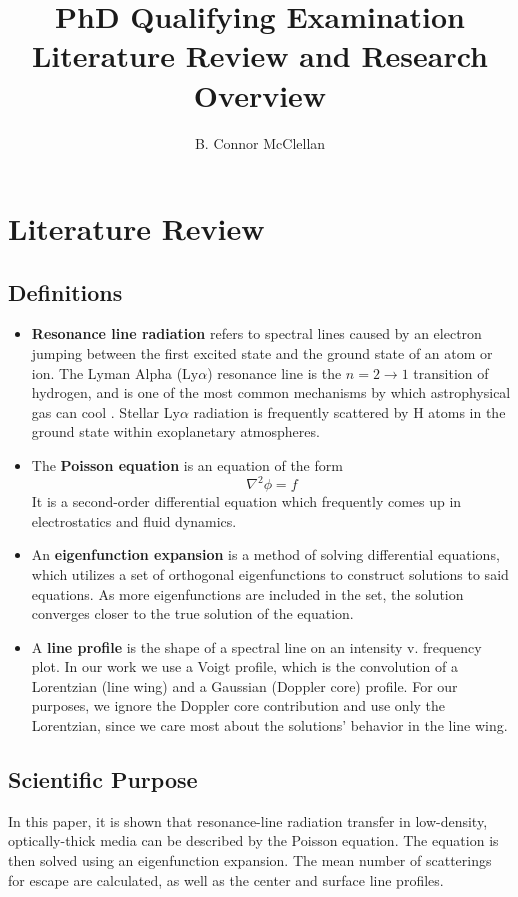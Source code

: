 \documentclass[onecolumn]{aastex63}
\begin{document}
\title{PhD Qualifying Examination \\ \small{\normalfont Literature Review and Research Overview}}
\author{B. Connor McClellan}
\keywords{}

\tableofcontents

\section{Literature Review}

\subsection{Definitions}
\begin{itemize}
    \item \textbf{Resonance line radiation} refers to spectral lines caused by an electron jumping between the first excited state and the ground state of an atom or ion. The Lyman Alpha (Ly$\alpha$) resonance line is the $n=2\rightarrow1$ transition of hydrogen, and is one of the most common mechanisms by which astrophysical gas can cool \citep{neufeld1990}. Stellar Ly$\alpha$ radiation is frequently scattered by H atoms in the ground state within exoplanetary atmospheres.
    \item The \textbf{Poisson equation} is an equation of the form
    \begin{equation}
        \nabla^2 \phi = f
    \end{equation}
    It is a second-order differential equation which frequently comes up in electrostatics and fluid dynamics.
    \item An \textbf{eigenfunction expansion} is a method of solving differential equations, which utilizes a set of orthogonal eigenfunctions to construct solutions to said equations. As more eigenfunctions are included in the set, the solution converges closer to the true solution of the equation.
    \item A \textbf{line profile} is the shape of a spectral line on an intensity v. frequency plot. In our work we use a Voigt profile, which is the convolution of a Lorentzian (line wing) and a Gaussian (Doppler core) profile. For our purposes, we ignore the Doppler core contribution and use only the Lorentzian, since we care most about the solutions' behavior in the line wing.
\end{itemize}

\subsection{Scientific Purpose}
In this paper, it is shown that resonance-line radiation transfer in low-density, optically-thick media can be described by the Poisson equation. The equation is then solved using an eigenfunction expansion. The mean number of scatterings for escape are calculated, as well as the center and surface line profiles.
\end{document}
